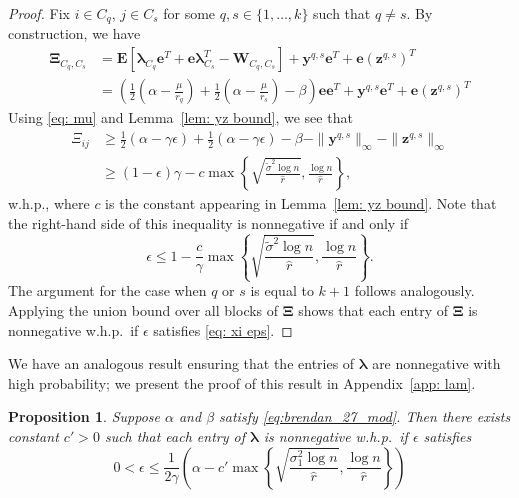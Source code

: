 \documentclass[twoside,11pt]{article}
\newtheorem{proposition}{Proposition}[section]
\newcommand{\E}{\mathbf{E}}
\newcommand{\bs}{\boldsymbol}
\newcommand{\0}{\bs{0}}
\newcommand{\sbra}[1] {\ensuremath{ \left[ #1\right]}} %
\newcommand{\rbra}[1]{\ensuremath{\left( #1 \right)}} %
\newcommand{\bra}[1]{\ensuremath{\left\{ #1 \right\}}} %
\begin{document}
{\begin{proof}
	Fix $i \in C_q$, $j \in C_s$ for some $q,s \in \{1, \dots, k\}$ such that $q \neq s$. 
	By construction, we have
	\begin{align*}
	\bs{\Xi}_{C_q,C_s} %
	&= \E\sbra{\bs{\lambda}_{C_q}\bs{e}^T+\bs{e}\bs{\lambda}_{C_s}^T - \bs{W}_{C_q,C_s}}+ \bs{y}^{q,s}\bs{e}^T+\bs{e}
	\left(\bs{z}^{q,s}\right)^T \\
	&= \left(\frac{1}{2} \left(\alpha - \frac{\mu}{r_q} \right) + \frac{1}{2} \left(\alpha - \frac{\mu}{r_s} \right) - \beta\right)
	\bs{e}\bs{e}^T + \bs{y}^{q,s}\bs{e}^T+\bs{e}\left(\bs{z}^{q,s}\right)^T 
	\end{align*}
	Using 
	\eqref{eq: mu} and
	 Lemma~\ref{lem: yz bound}, we see that 
	\begin{align*}
	\Xi_{ij} &\geq \frac{1}{2} \left(\alpha - \gamma \epsilon \right) + \frac{1}{2} \left(\alpha - \gamma \epsilon \right) - \beta -
	\|\bs{y}^{q,s}\|_{\infty}-\|\bs{z}^{q,s}\|_{\infty} \\
	& \ge (1 - \epsilon)\gamma - c \max \bra{ \sqrt{ \frac{\tilde \sigma^2 \log n}{\hat r}} ,
			\frac{\log n}{\hat r} },
	\end{align*}
	w.h.p., where $c$ is the constant appearing in 
	Lemma~\ref{lem: yz bound}. Note that 
	the right-hand side of this inequality is nonnegative	if and only if  
	\[\epsilon \leq 1 - \frac{c}{\gamma}\max \bra{ \sqrt{ \frac{\tilde \sigma^2 \log n}{\hat r}} ,
			\frac{\log n}{\hat r} } . \]
	The argument for the case when $q$ or $s$ is equal to $k+1$
	follows analogously.
	Applying the union bound over all blocks of \(\bs \Xi\) shows that each entry
	of $\bs{\Xi}$ is nonnegative 
	w.h.p.~if $\epsilon$ satisfies \eqref{eq: xi eps}.
\end{proof}
\medskip

We have an analogous result ensuring that the entries of \(\bs\lambda\) are nonnegative
with high probability; we present the proof of this result in Appendix~\ref{app: lam}.

\begin{proposition} \label{prop: lam}
	Suppose $\alpha$ and $\beta$ satisfy \eqref{eq:brendan_27_mod}. Then there
	exists constant $c' > 0$ such that each entry of $\bs{\lambda}$ is nonnegative w.h.p.~if $\epsilon$ satisfies
	\begin{equation} \label{eq: lam eps}
	0 < \epsilon \leq  \frac{1}{2\gamma}
	\rbra{ \alpha  - c' \max \bra{ \sqrt{  \frac{\sigma_1^2 \log 		n }{\hat r} },
			\frac{\log n }{\hat r} } }
	\end{equation}
\end{proposition}

}
\end{document}
